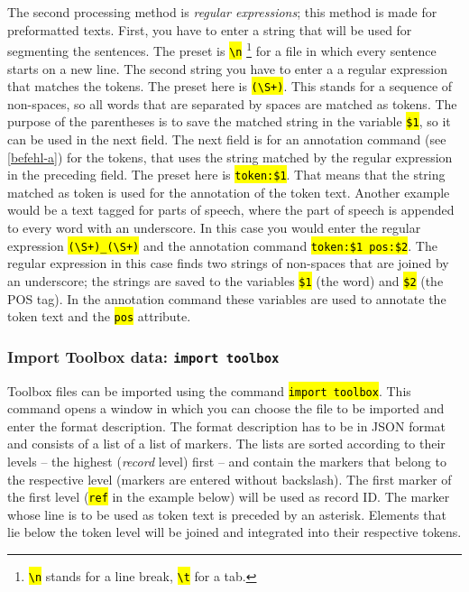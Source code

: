 \documentclass[12pt]{scrartcl}
\newcommand{\code}[1]{\hl{\texttt{#1}}}
\begin{document}
The second processing method is \textit{regular expressions}; this method is made for preformatted texts.
First, you have to enter a string that will be used for segmenting the sentences.
The preset is \code{{\textbackslash}n} \footnote{\code{{\textbackslash}n} stands for a line break, \code{{\textbackslash}t} for a tab.} for a file in which every sentence starts on a new line.
The second string you have to enter a a regular expression that matches the tokens.
The preset here is \code{({\textbackslash}S+)}.
This stands for a sequence of non-spaces, so all words that are separated by spaces are matched as tokens.
The purpose of the parentheses is to save the matched string in the variable \code{\$1}, so it can be used in the next field.
The next field is for an annotation command (see \ref{befehl-a}) for the tokens, that uses the string matched by the regular expression in the preceding field.
The preset here is \code{token:\$1}.
That means that the string matched as token is used for the annotation of the token text.
Another example would be a text tagged for parts of speech, where the part of speech is appended to every word with an underscore.
In this case you would enter the regular expression \code{({\textbackslash}S+)\_({\textbackslash}S+)} and the annotation command \code{token:\$1 pos:\$2}.
The regular expression in this case finds two strings of non-spaces that are joined by an underscore; the strings are saved to the variables \code{\$1} (the word) and \code{\$2} (the POS tag).
In the annotation command these variables are used to annotate the token text and the \code{pos} attribute.


\subsubsection{Import Toolbox data: \texttt{import toolbox}}

Toolbox files can be imported using the command \code{import toolbox}.
This command opens a window in which you can choose the file to be imported and enter the format description.
The format description has to be in JSON format and consists of a list of a list of markers.
The lists are sorted according to their levels – the highest (\textit{record} level) first – and contain the markers that belong to the respective level (markers are entered without backslash).
The first marker of the first level (\code{ref} in the example below) will be used as record ID.
The marker whose line is to be used as token text is preceded by an asterisk.
Elements that lie below the token level will be joined and integrated into their respective tokens.
\end{document}
